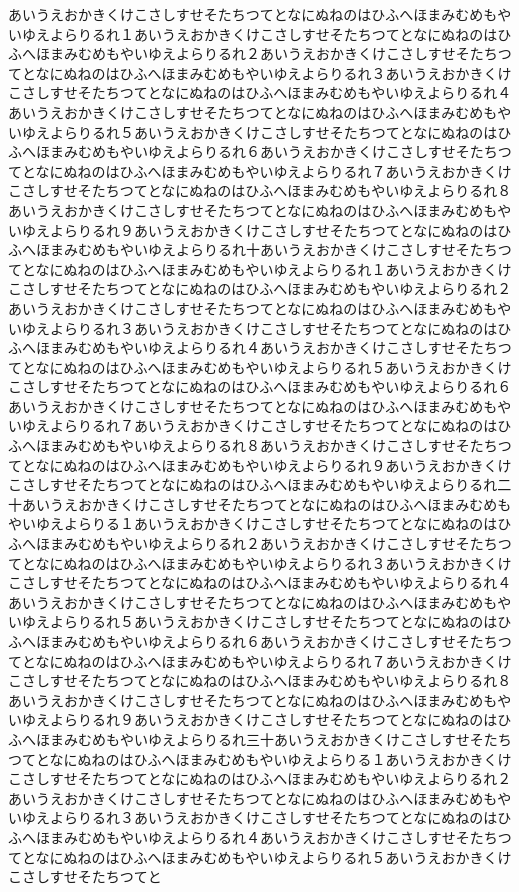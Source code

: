 \documentclass[uplatex,dvipdfmx,11pt]{jsbook}
\begin{document}
  \newpage

      あいうえおかきくけこさしすせそたちつてとなにぬねのはひふへほまみむめもやいゆえよらりるれ１あいうえおかきくけこさしすせそたちつてとなにぬねのはひふへほまみむめもやいゆえよらりるれ２あいうえおかきくけこさしすせそたちつてとなにぬねのはひふへほまみむめもやいゆえよらりるれ３あいうえおかきくけこさしすせそたちつてとなにぬねのはひふへほまみむめもやいゆえよらりるれ４あいうえおかきくけこさしすせそたちつてとなにぬねのはひふへほまみむめもやいゆえよらりるれ５あいうえおかきくけこさしすせそたちつてとなにぬねのはひふへほまみむめもやいゆえよらりるれ６あいうえおかきくけこさしすせそたちつてとなにぬねのはひふへほまみむめもやいゆえよらりるれ７あいうえおかきくけこさしすせそたちつてとなにぬねのはひふへほまみむめもやいゆえよらりるれ８あいうえおかきくけこさしすせそたちつてとなにぬねのはひふへほまみむめもやいゆえよらりるれ９あいうえおかきくけこさしすせそたちつてとなにぬねのはひふへほまみむめもやいゆえよらりるれ十あいうえおかきくけこさしすせそたちつてとなにぬねのはひふへほまみむめもやいゆえよらりるれ１あいうえおかきくけこさしすせそたちつてとなにぬねのはひふへほまみむめもやいゆえよらりるれ２あいうえおかきくけこさしすせそたちつてとなにぬねのはひふへほまみむめもやいゆえよらりるれ３あいうえおかきくけこさしすせそたちつてとなにぬねのはひふへほまみむめもやいゆえよらりるれ４あいうえおかきくけこさしすせそたちつてとなにぬねのはひふへほまみむめもやいゆえよらりるれ５あいうえおかきくけこさしすせそたちつてとなにぬねのはひふへほまみむめもやいゆえよらりるれ６あいうえおかきくけこさしすせそたちつてとなにぬねのはひふへほまみむめもやいゆえよらりるれ７あいうえおかきくけこさしすせそたちつてとなにぬねのはひふへほまみむめもやいゆえよらりるれ８あいうえおかきくけこさしすせそたちつてとなにぬねのはひふへほまみむめもやいゆえよらりるれ９あいうえおかきくけこさしすせそたちつてとなにぬねのはひふへほまみむめもやいゆえよらりるれ二十あいうえおかきくけこさしすせそたちつてとなにぬねのはひふへほまみむめもやいゆえよらりる１あいうえおかきくけこさしすせそたちつてとなにぬねのはひふへほまみむめもやいゆえよらりるれ２あいうえおかきくけこさしすせそたちつてとなにぬねのはひふへほまみむめもやいゆえよらりるれ３あいうえおかきくけこさしすせそたちつてとなにぬねのはひふへほまみむめもやいゆえよらりるれ４あいうえおかきくけこさしすせそたちつてとなにぬねのはひふへほまみむめもやいゆえよらりるれ５あいうえおかきくけこさしすせそたちつてとなにぬねのはひふへほまみむめもやいゆえよらりるれ６あいうえおかきくけこさしすせそたちつてとなにぬねのはひふへほまみむめもやいゆえよらりるれ７あいうえおかきくけこさしすせそたちつてとなにぬねのはひふへほまみむめもやいゆえよらりるれ８あいうえおかきくけこさしすせそたちつてとなにぬねのはひふへほまみむめもやいゆえよらりるれ９あいうえおかきくけこさしすせそたちつてとなにぬねのはひふへほまみむめもやいゆえよらりるれ三十あいうえおかきくけこさしすせそたちつてとなにぬねのはひふへほまみむめもやいゆえよらりる１あいうえおかきくけこさしすせそたちつてとなにぬねのはひふへほまみむめもやいゆえよらりるれ２あいうえおかきくけこさしすせそたちつてとなにぬねのはひふへほまみむめもやいゆえよらりるれ３あいうえおかきくけこさしすせそたちつてとなにぬねのはひふへほまみむめもやいゆえよらりるれ４あいうえおかきくけこさしすせそたちつてとなにぬねのはひふへほまみむめもやいゆえよらりるれ５あいうえおかきくけこさしすせそたちつてと
\end{document}

